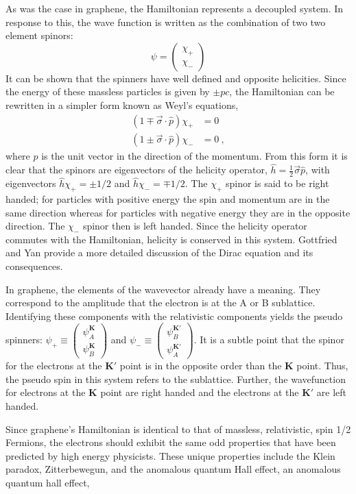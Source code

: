 As was the case in graphene, the Hamiltonian represents a decoupled system.
In response to this, the wave function is written as the combination of two two element spinors:
\begin{equation*}
	\psi=\left( \begin{array}{c} \chi_{+} \\ \chi_{-} \end{array} \right)
\end{equation*}
It can be shown that the spinners have well defined and opposite helicities.
Since the energy of these massless particles is given by $\pm p c$, the Hamiltonian can be rewritten in a simpler form known as Weyl's equations,
\begin{align*}
	(1 \mp \vec{\sigma} \cdot \hat{p}) \chi_{+}&=0 \\
	(1 \pm \vec{\sigma} \cdot \hat{p}) \chi_{-}&=0 \ ,
\end{align*}
where $\hat{p}$ is the unit vector in the direction of the momentum.
From this form it is clear that the spinors are eigenvectors of the helicity operator, $\hat{h}=\frac{1}{2} \vec{\sigma} \hat{p}$, with eigenvectors $\hat{h} \chi_+=\pm 1/2$ and $\hat{h} \chi_-=\mp 1/2$.
The $\chi_+$ spinor is said to be right handed; for particles with positive energy the spin and momentum are in the same direction whereas for particles with negative energy they are in the opposite direction.
The $\chi_-$ spinor then is left handed.
Since the helicity operator commutes with the Hamiltonian, helicity is conserved in this system.
Gottfried and Yan provide a more detailed discussion of the Dirac equation and its consequences\cite{Gottfried2003}.

In graphene, the elements of the wavevector already have a meaning.
They correspond to the amplitude that the electron is at the A or B sublattice.
Identifying these components with the relativistic components yields the pseudo spinners: $\psi_+ \equiv \left(\begin{array}{c} \psi_A^{\bm{K}} \\ \psi_B^{\bm{K}} \end{array} \right)$ and $\psi_- \equiv \left(\begin{array}{c} \psi_B^{\bm{K'}} \\ \psi_A^{\bm{K'}} \end{array} \right)$.
It is a subtle point that the spinor for the electrons at the $\bm{K'}$ point is in the opposite order than the $\bm{K}$ point.
Thus, the pseudo spin in this system refers to the sublattice.
Further, the wavefunction for electrons at the $\bm{K}$ point are right handed and the electrons at the $\bm{K'}$ are left handed.

Since graphene's Hamiltonian is identical to that of massless, relativistic, spin 1/2 Fermions, the electrons should exhibit the same odd properties that have been predicted by high energy physicists.
These unique properties include the Klein paradox, Zitterbewegun, and the anomalous quantum Hall effect, an anomalous quantum hall effect, 